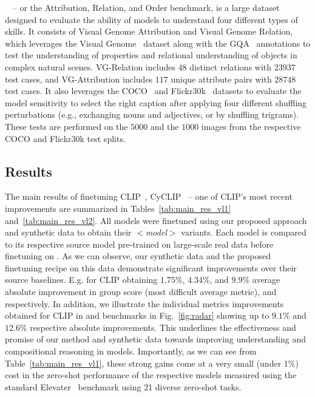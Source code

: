 \noindent\textbf{\ARO{}~\cite{aro}} -- or the Attribution, Relation, and Order benchmark, is a large dataset designed to evaluate the ability of \vl{} models to understand four different types of skills. It consists of Visual Genome Attribution and Visual Genome Relation, which leverages the Visual Genome~\cite{vg} dataset along with the GQA~\cite{gqa} annotations to test the understanding of properties and relational understanding of objects in complex natural scenes. VG-Relation includes $48$ distinct relations with $23937$ test cases, and VG-Attribution includes $117$ unique attribute pairs with $28748$ test cases. It also leverages the COCO~\cite{coco} and Flickr30k~\cite{flickr30k} datasets to evaluate the model sensitivity to select the right caption after applying four different shuffling perturbations (e.g., exchanging nouns and adjectives, or by shuffling trigrams). These tests are performed on the $5000$ and the $1000$ images from the respective COCO and Flickr30k test splits.

\vspace{-.05em}
\subsection{Results}
\label{sec:results}
The main results of finetuning CLIP~\cite{clip}, CyCLIP~\cite{cyclip} -- one of CLIP's most recent improvements
are summarized in Tables~\ref{tab:main_res_vl1} and~\ref{tab:main_res_vl2}. All models were finetuned using our proposed approach and \ourdataset{} synthetic data to obtain their \ours{}$<$\textit{model}$>$ variants. Each model is compared to its respective source model pre-trained on large-scale real data before finetuning on \ourdataset{}. As we can observe, our \ourdataset{} synthetic data and the proposed finetuning recipe on this data demonstrate significant improvements over their source baselines. E.g. for CLIP obtaining $1.75\%$, $4.34\%$, and $9.9\%$ average absolute improvement in \winoground{} group score (most difficult average metric), \vlchecklist{} and \ARO{} respectively. In addition, we illustrate the individual \vlc{} metrics improvements obtained for CLIP in \vlchecklist{} and \ARO{} benchmarks in Fig.~\ref{fig:radar} showing up to $9.1\%$ and $12.6\%$ respective absolute improvements. This underlines the effectiveness and promise of our method and \ourdataset{} synthetic data towards improving \vlc{} understanding and compositional reasoning in \vl{} models. Importantly, as we can see from Table~\ref{tab:main_res_vl1}, these strong gains come at a very small (under 1\%) cost in the zero-shot performance of the respective \vl{} models measured using the standard Elevater~\cite{elevater} benchmark using 21 diverse zero-shot tasks.

